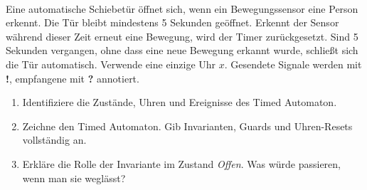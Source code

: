 \newcommand{\printpraesenzlsg}{false}
\newcommand{\printloesungen}{true}
\newcommand{\printbewertungen}{false}
\newcommand{\blattnummer}{6}

\usepackage[utf8]{inputenc}
\usepackage{array}
\usetikzlibrary{automata}

\newcommand{\snd}[1]{\textit{#1}!}
\newcommand{\rcv}[1]{\textit{#1}?}


\iforiginal{}


\\
Eine automatische Schiebetür öffnet sich, wenn ein Bewegungssensor eine Person erkennt.
Die Tür bleibt mindestens 5 Sekunden geöffnet. Erkennt der Sensor während dieser Zeit erneut
eine Bewegung, wird der Timer zurückgesetzt. Sind 5 Sekunden vergangen, ohne dass eine neue
Bewegung erkannt wurde, schließt sich die Tür automatisch. Verwende eine einzige Uhr $x$.
Gesendete Signale werden mit \textbf{!}, empfangene mit \textbf{?} annotiert.

\begin{enumerate}
    \item Identifiziere die Zustände, Uhren und Ereignisse des Timed Automaton.
    \item Zeichne den Timed Automaton. Gib Invarianten, Guards und Uhren-Resets vollständig an.
    \item Erkläre die Rolle der Invariante im Zustand \textit{Offen}. Was würde passieren,
          wenn man sie weglässt?
\end{enumerate}

